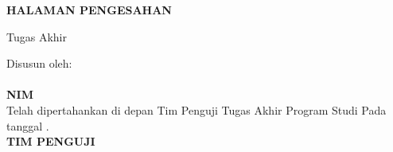 
\newpage
\logowatermark
{}
\begin{center}
        \textbf{\large \MakeUppercase{halaman pengesahan}}
\end{center}

\begin{center}
    Tugas Akhir
\end{center}

\begin{center}
        \textbf{\large \MakeUppercase {\judulid}}
\end{center}

\begin{center}
    Disusun oleh:\\
    \textbf{\penulis}\\
    \textbf{NIM \nim}\\[1.5cm]

    Telah dipertahankan di depan Tim Penguji Tugas Akhir Program Studi {\prodi} {\fakultas} {\universitas} Pada tanggal {\tglpengesahan}.\\[1cm]

    \textbf{\MakeUppercase{TIM PENGUJI}}
\end{center}

